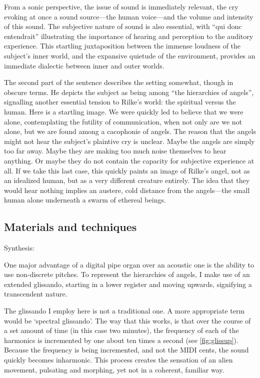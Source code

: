 \documentclass[12pt,twoside,maitrise]{dms_ks}
\theoremstyle{definition}
\begin{document}
{From a sonic perspective, the issue of sound is immediately relevant, the cry evoking at once a sound source---the human voice---and the volume and intensity of this sound.
The subjective nature of sound is also essential, with “qui donc entendrait” illustrating the importance of hearing and perception to the auditory experience.
This startling juxtaposition between the immense loudness of the subject's inner world, and the expansive quietude of the environment, provides an immediate dialectic between inner and outer worlds.

The second part of the sentence describes the setting somewhat, though in obscure terms.
He depicts the subject as being among “the hierarchies of angels”, signalling another essential tension to Rilke's world: the spiritual versus the human.
Here is a startling image.
We were quickly led to believe that we were alone, contemplating the futility of communication, when not only are we not alone, but we are found among a cacophonie of angels.
The reason that the angels might not hear the subject's plaintive cry is unclear. 
Maybe the angels are simply too far away.
Maybe they are making too much noise themselves to hear anything.
Or maybe they do not contain the capacity for subjective experience at all.
If we take this last case, this quickly paints an image of Rilke's angel, not as an idealized human, but as a very different creature entirely.
The idea that they would hear nothing implies an austere, cold distance from the angels---the small human alone underneath a swarm of ethereal beings.

\subsection{Materials and techniques}

Synthesis:

One major advantage of a digital pipe organ over an acoustic one is the ability to use non-discrete pitches.
To represent the hierarchies of angels, I make use of an extended glissando, starting in a lower register and moving upwards, signifying a transcendent nature.

The glissando I employ here is not a traditional one. 
A more appropriate term would be `spectral glissando'. 
The way that this works, is that over the course of a set amount of time (in this case two minutes), the frequency of each of the harmonics is incremented by one about ten times a second (see \cref{fig:glissup}).
Because the frequency is being incremented, and not the MIDI cents, the sound quickly becomes inharmonic.
This process creates the sensation of an alien movement, pulsating and morphing, yet not in a coherent, familiar way.

}
\end{document}
